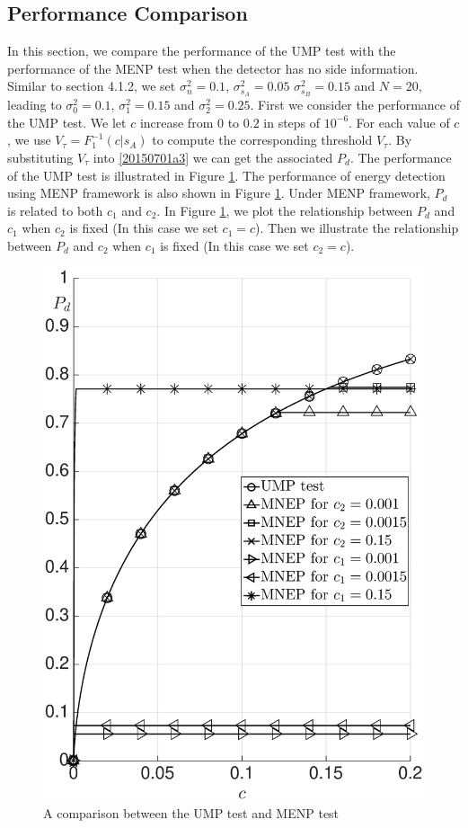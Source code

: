 \subsection{Performance Comparison}
In this section, we compare the performance of the UMP test with the performance of the MENP test when the detector has no side information.
Similar to section 4.1.2, we set $\sigma_n^2= 0.1$, $\sigma_{s_A}^2 = 0.05$ $\sigma_{s_B}^2 = 0.15$ and $N=20$, leading to  $\sigma_0^2 = 0.1$, $\sigma_1^2=0.15$ and $\sigma_2^2 = 0.25$. 
First we consider the performance of the UMP test. 
We let $c$ increase from $0$ to $0.2$ in steps of $10^{-6}$. For each value of $c$, we use $V_\tau = F_1^{-1}(c|s_A)$ to compute the corresponding threshold $V_\tau$. By substituting $V_\tau$ into \eqref{20150701a3} we can get the associated $P_d$. The performance of the UMP test is illustrated in Figure \ref{pic:20150701a0}. 
The performance of energy detection using MENP framework is also shown in Figure \ref{pic:20150701a0}. Under MENP framework, $P_d$ is related to both $c_1$ and $c_2$. In Figure \ref{pic:20150701a0}, we plot the relationship between $P_d$ and $c_1$ when $c_2$ is fixed (In this case we set $c_1 = c$). Then we illustrate the relationship between $P_d$ and $c_2$ when $c_1$ is fixed (In this case we set $c_2 = c$).   

\begin{figure}[!hbp]
\centering
\includegraphics[width = 14cm]{5/noSI.eps}
\caption{A comparison between the UMP test and MENP test}
\label{pic:20150701a0}
\end{figure}

